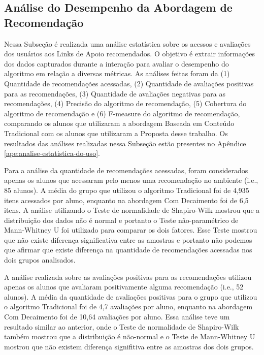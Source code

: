 \subsection{Análise do Desempenho da Abordagem de Recomendação}\label{subsection:analise-uso-sr}

Nessa Subseção é realizada uma análise estatística sobre os acessos e avaliações dos usuários aos Links de Apoio recomendados.
O objetivo é extrair informações dos dados capturados durante a interação para avaliar o desempenho do algoritmo em
relação a diversas métricas. As análises feitas foram da (1) Quantidade de recomendações acessadas,
(2) Quantidade de avaliações positivas para as recomendações, (3) Quantidade de avaliações negativas para as recomendações,
(4) Precisão do algoritmo de recomendação, (5) Cobertura do algoritmo de recomendação e (6) F-measure do algoritmo de
recomendação, comparando os alunos que utilizaram a abordagem Baseada em Conteúdo Tradicional com os alunos
que utilizaram a Proposta desse trabalho. Os resultados das análises realizadas nessa Subseção estão presentes no Apêndice \ref{ape:analise-estatistica-do-uso}.

Para a análise da quantidade de recomendações acessadas, foram considerados apenas os alunos que acessaram pelo
menos uma recomendação no ambiente (i.e., 85 alunos). A média do grupo que utilizou o algoritmo Tradicional foi de 4,935 itens
acessados por aluno, enquanto na abordagem Com Decaimento foi de 6,5 itens. A análise utilizando o Teste de normalidade de
Shapiro-Wilk mostrou que a distribuição dos dados não é normal e portanto o Teste não-paramétrico de Mann-Whitney U foi utilizado
para comparar os dois fatores. Esse Teste mostrou que não existe diferença significativa entre as amostras e portanto
não podemos que afirmar que existe diferença na quantidade de recomendações acessadas nos dois grupos analisados.

A análise realizada sobre as avaliações positivas para as recomendações utilizou apenas os alunos que avaliaram positivamente
alguma recomendação (i.e., 52 alunos). A média da quantidade de avaliações positivas para o grupo que utilizou o algoritmo
Tradicional foi de 4,7 avaliações por aluno, enquanto na abordagem Com Decaimento foi de 10,64 avaliações por aluno.
Essa análise teve um resultado similar ao anterior, onde o Teste de normalidade de Shapiro-Wilk também mostrou que a
distribuição é não-normal e o Teste de Mann-Whitney U mostrou que não existem diferença signifitiva entre
as amostras dos dois grupos.

